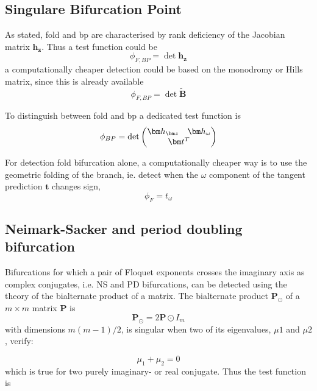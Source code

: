\subsection{Singulare Bifurcation Point}

As stated, fold and \gls{bp} are characterised by rank deficiency of the
Jacobian matrix $\bm h_{\bm z}$. Thus a test function could be
\begin{equation}
  \phi_{F,BP} = \det{\bm h_{\bm z}}
\end{equation}
a computationally cheaper detection could be based on the monodromy or Hills
matrix, since this is already available
\begin{equation}
  \phi_{F,BP} = \det{\tilde{\bm B}}
\end{equation}

To distinguish between fold and \gls{bp} a dedicated test function is
\begin{equation}
  \phi_{BP} = \det
    \begin{pmatrix}
      \bm h_{\bm z} & \bm h_{\omega} \\
      \multicolumn{2}{c}{\bm t^T}
    \end{pmatrix}
\end{equation}

For detection fold bifurcation alone, a computationally cheaper way is to use
the geometric folding of the branch, ie. detect when the $\omega$ component of
the tangent prediction $\bm t$ changes sign,
\begin{equation}
  \phi_{F} = t_\omega
\end{equation}

\subsection{Neimark-Sacker and period doubling bifurcation}


Bifurcations for which a pair of Floquet exponents crosses the imaginary axis as
complex conjugates, i.e. NS and PD bifurcations, can be detected using the
theory of the bialternate product of a matrix. The bialternate product $\bm
P_\odot $ of a $m \times m$ matrix $\bm P$ is
\begin{equation}
  \bm P_\odot = 2\bm P \odot I_m
\end{equation}
with dimensions $m(m-1)/2$, is singular when two of its eigenvalues, $\mu 1$ and
$\mu 2$, verify:

\begin{equation}
  \mu_1 + \mu_2 = 0
\end{equation}
which is true for two purely imaginary- or real conjugate. Thus the test
function is

